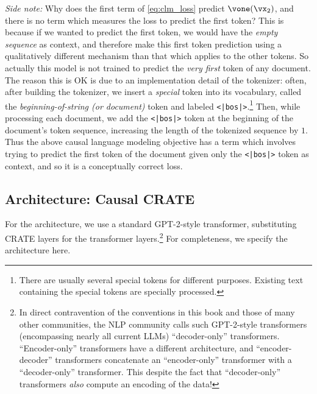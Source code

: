 \documentclass[../../book-main.tex]{subfiles}
\begin{document}
\textit{Side note:} Why does the first term of \eqref{eq:clm_loss}
predict \(\vone(\vx_{2})\), and there is no term which measures the
loss to predict the first token? This is because if we wanted to predict
the first token, we would have the \textit{empty sequence} as
context, and therefore make this first token prediction using a
qualitatively different mechanism than that which applies to the
other tokens. So actually this model is not trained to predict the
\textit{very first} token of any document. The reason this is OK is
due to an implementation detail of the tokenizer: often, after
building the tokenizer, we insert a \textit{special} token into its
vocabulary, called the \textit{beginning-of-string (or document)}
token and labeled \texttt{<|bos|>}.\footnote{There are usually
several special tokens for different purposes. Existing text
containing the special tokens are specially processed.} Then, while
processing each document, we add the \texttt{<|bos|>} token at the
beginning of the document's token sequence, increasing the length of
the tokenized sequence by \(1\). Thus the above causal language
modeling objective has a term which involves trying to predict the
first token of the document given only the \texttt{<|bos|>} token as
context, and so it is a conceptually correct loss.

\subsection{Architecture: Causal CRATE}

For the architecture, we use a standard GPT-2-style transformer,
substituting CRATE layers for the transformer layers.\footnote{In
direct contravention of the conventions in this book and those of
many other communities, the NLP community calls such GPT-2-style
transformers (encompassing nearly all current LLMs) ``decoder-only''
transformers. ``Encoder-only'' transformers have a different
architecture, and ``encoder-decoder'' transformers concatenate an
``encoder-only'' transformer with a ``decoder-only'' transformer.
This despite the fact that ``decoder-only'' transformers
\textit{also} compute an encoding of the data!} For completeness, we
specify the architecture here.
\end{document}
